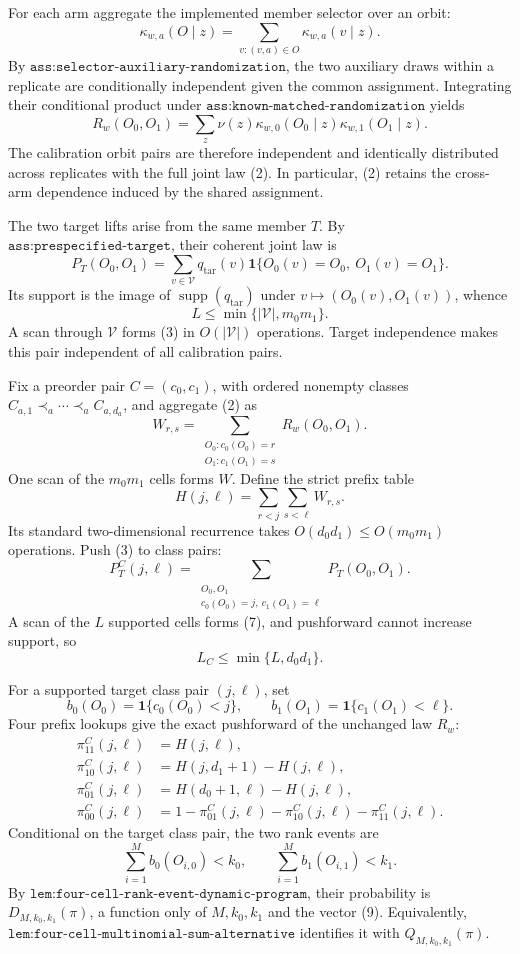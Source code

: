 For each arm aggregate the implemented member selector over an orbit:
\[
\kappa_{w,a}(O\mid z)=\sum_{v:(v,a)\in O}\kappa_{w,a}(v\mid z). \tag{1}
\]
By \(\texttt{ass:selector-auxiliary-randomization}\), the two auxiliary draws within a replicate are conditionally independent given the common assignment.  Integrating their conditional product under \(\texttt{ass:known-matched-randomization}\) yields
\[
R_w(O_0,O_1)=\sum_z\nu(z)\kappa_{w,0}(O_0\mid z)\kappa_{w,1}(O_1\mid z). \tag{2}
\]
The calibration orbit pairs are therefore independent and identically distributed across replicates with the full joint law (2).  In particular, (2) retains the cross-arm dependence induced by the shared assignment.

The two target lifts arise from the same member \(T\).  By \(\texttt{ass:prespecified-target}\), their coherent joint law is
\[
P_T(O_0,O_1)=\sum_{v\in\mathcal V}q_{\mathrm{tar}}(v)
\mathbf 1\{O_0(v)=O_0,\ O_1(v)=O_1\}. \tag{3}
\]
Its support is the image of \(\operatorname{supp}(q_{\mathrm{tar}})\) under \(v\mapsto(O_0(v),O_1(v))\), whence
\[
L\le\min\{|\mathcal V|,m_0m_1\}. \tag{4}
\]
A scan through \(\mathcal V\) forms (3) in \(O(|\mathcal V|)\) operations.  Target independence makes this pair independent of all calibration pairs.

Fix a preorder pair \(C=(c_0,c_1)\), with ordered nonempty classes \(C_{a,1}\prec_a\cdots\prec_a C_{a,d_a}\), and aggregate (2) as
\[
W_{r,s}=\sum_{\substack{O_0:c_0(O_0)=r\\O_1:c_1(O_1)=s}}R_w(O_0,O_1). \tag{5}
\]
One scan of the \(m_0m_1\) cells forms \(W\).  Define the strict prefix table
\[
H(j,\ell)=\sum_{r<j}\sum_{s<\ell}W_{r,s}. \tag{6}
\]
Its standard two-dimensional recurrence takes \(O(d_0d_1)\le O(m_0m_1)\) operations.  Push (3) to class pairs:
\[
P_T^C(j,\ell)=
\sum_{\substack{O_0,O_1\\c_0(O_0)=j,\ c_1(O_1)=\ell}}P_T(O_0,O_1). \tag{7}
\]
A scan of the \(L\) supported cells forms (7), and pushforward cannot increase support, so
\[
L_C\le\min\{L,d_0d_1\}. \tag{8}
\]

For a supported target class pair \((j,\ell)\), set
\[
b_0(O_0)=\mathbf 1\{c_0(O_0)<j\},\qquad
b_1(O_1)=\mathbf 1\{c_1(O_1)<\ell\}.
\]
Four prefix lookups give the exact pushforward of the unchanged law \(R_w\):
\[
\begin{aligned}
\pi_{11}^C(j,\ell)&=H(j,\ell),\\
\pi_{10}^C(j,\ell)&=H(j,d_1+1)-H(j,\ell),\\
\pi_{01}^C(j,\ell)&=H(d_0+1,\ell)-H(j,\ell),\\
\pi_{00}^C(j,\ell)&=1-\pi_{01}^C(j,\ell)-\pi_{10}^C(j,\ell)-\pi_{11}^C(j,\ell).
\end{aligned} \tag{9}
\]
Conditional on the target class pair, the two rank events are
\[
\sum_{i=1}^M b_0(O_{i,0})<k_0,\qquad
\sum_{i=1}^M b_1(O_{i,1})<k_1. \tag{10}
\]
By \(\texttt{lem:four-cell-rank-event-dynamic-program}\), their probability is \(D_{M,k_0,k_1}(\pi)\), a function only of \(M,k_0,k_1\) and the vector (9).  Equivalently, \(\texttt{lem:four-cell-multinomial-sum-alternative}\) identifies it with \(Q_{M,k_0,k_1}(\pi)\).

